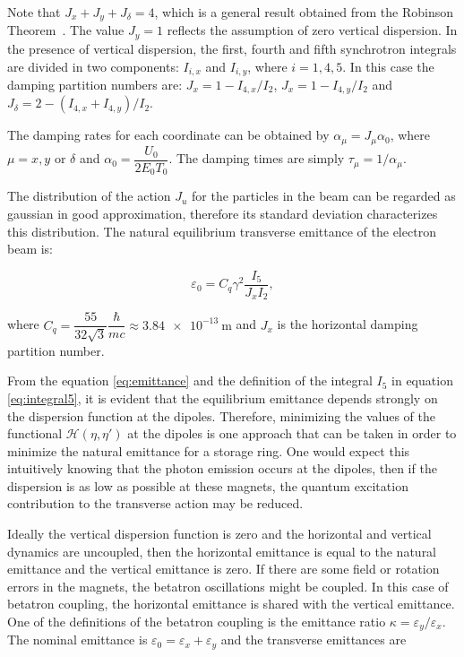 Note that $J_x + J_y + J_{\delta} = 4$, which is a general result obtained from the Robinson Theorem~\cite{Robinson1958}. The value $J_y = 1$ reflects the assumption of zero vertical dispersion. In the presence of vertical dispersion, the first, fourth and fifth synchrotron integrals are divided in two components: $I_{i, x}$ and $I_{i, y}$, where $i = 1, 4, 5$. In this case the damping partition numbers are: $J_x = 1 - I_{4, x}/I_2$, $J_x = 1 - I_{4, y}/I_2$ and $J_{\delta} = 2 - (I_{4, x} + I_{4, y})/I_2$.

The damping rates for each coordinate can be obtained by $\alpha_{\mu} = J_{\mu} \alpha_0$, where $\mu = x, y$ or $\delta$ and $\alpha_0 = \dfrac{U_0}{2E_0T_0}$. The damping times are simply $\tau_{\mu} = 1/\alpha_{\mu}$.

The distribution of the action $J_u$ for the particles in the beam can be regarded as gaussian in good approximation, therefore its standard deviation characterizes this distribution. The natural equilibrium transverse emittance of the electron beam is:

\begin{equation}
    \varepsilon_0 = C_q \gamma^2 \dfrac{I_5}{J_x I_2},
    \label{eq:emittance}
\end{equation}

where $C_q = \dfrac{55}{32 \sqrt{3}}\dfrac{\hbar}{mc} \approx \SI{3.84e-13}{\metre}$ and $J_x$ is the horizontal damping partition number.

From the equation \eqref{eq:emittance} and the definition of the integral $I_5$ in equation \eqref{eq:integral5}, it is evident that the equilibrium emittance depends strongly on the dispersion function at the dipoles. Therefore, minimizing the values of the functional $\mathcal{H}(\eta, \eta')$ at the dipoles is one approach that can be taken in order to minimize the natural emittance for a storage ring. One would expect this intuitively knowing that the photon emission occurs at the dipoles, then if the dispersion is as low as possible at these magnets, the quantum excitation contribution to the transverse action may be reduced.

Ideally the vertical dispersion function is zero and the horizontal and vertical dynamics are uncoupled, then the horizontal emittance is equal to the natural emittance and the vertical emittance is zero. If there are some field or rotation errors in the magnets, the betatron oscillations might be coupled. In this case of betatron coupling, the horizontal emittance is shared with the vertical emittance. One of the definitions of the betatron coupling is the emittance ratio $\kappa = \varepsilon_y/\varepsilon_x$. The nominal emittance is $\varepsilon_0 = \varepsilon_x + \varepsilon_y$ and the transverse emittances are

